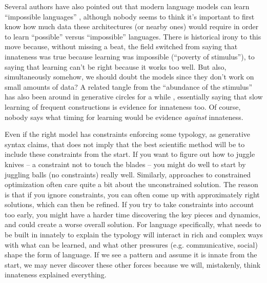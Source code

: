 \documentclass[output=paper,colorlinks,citecolor=brown
]{langscibook}
\begin{document}
Several authors have also pointed out that modern language models can learn ``impossible languages'' \citep{milway2023response,moro2023large}, although nobody seems to think it's important to first know how much data these architectures (or nearby ones) would require in order to learn ``possible'' versus ``impossible'' languages. There is historical irony to this move because, without missing a beat, the field switched from saying that innateness was true because learning was impossible (``poverty of stimulus''), to saying that learning can't be right because it works too well. But also, simultaneously somehow, we should doubt the models since they don't work  on small amounts of data? A related tangle from the ``abundance of the stimulus'' has also been around in generative circles for a while \citep{babyonyshev2001maturation}, essentially saying that slow learning of frequent constructions is evidence for innateness too.  Of course, nobody says what timing for learning would be evidence \textit{against} innateness. 

Even if the right model has constraints enforcing some typology, as generative syntax claims, that does not imply that the best scientific method will be to include these constraints from the start. If you want to figure out how to juggle knives -- a constraint not to touch the blades -- you might do well to start by juggling balls (no constraints) really well. Similarly, approaches to constrained optimization often care quite a bit about the unconstrained solution. The reason is that if you ignore constraints, you can often come up with approximately right solutions, which can then be refined. If you try to take constraints into account too early, you might have a harder time discovering the key pieces and dynamics, and could create a worse overall solution. For language specifically, what needs to be built in innately to explain the typology will interact in rich and complex ways with what can be learned, and what other pressures (e.g. communicative, social) shape the form of language. If we see a pattern and assume it is innate from the start, we may never discover these other forces because we will, mistakenly, think innateness explained everything. %
\end{document}
